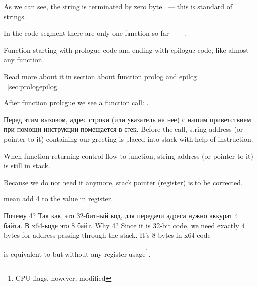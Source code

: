 {As we can see, the string is terminated by zero byte ~--- this is \CCpp standard of strings.}

{In the code segment  there are only one function so far ~--- .}

{Function  starting with prologue code and ending with epilogue code, like almost any function.}

{Read more about it in section about function prolog and epilog}
~\ref{sec:prologepilog}.

{After function prologue we see a function \printf call}: . 

\IFRU
{Перед этим вызовом, адрес строки (или указатель на нее) с нашим приветствием при помощи инструкции \PUSH помещается в стек.}
{Before the call, string address (or pointer to it) containing our greeting is placed into stack with help of \PUSH instruction.}

{When \printf function returning control flow to \main function, string address (or pointer to it) is still in stack.}

{Because we do not need it anymore, stack pointer (\ESP register) is to be corrected.}

 
{mean add 4 to the value in \ESP register.}

\IFRU
{Почему 4? Так как, это 32-битный код, для передачи адреса нужно аккурат 4 байта. В x64-коде это 8 байт.}
{Why 4? Since it is 32-bit code, we need exactly 4 bytes for address passing through the stack. 
It's 8 bytes in x64-code}

 
{is equivalent to  but without any register usage\footnote{CPU flags, however, modified}.}

